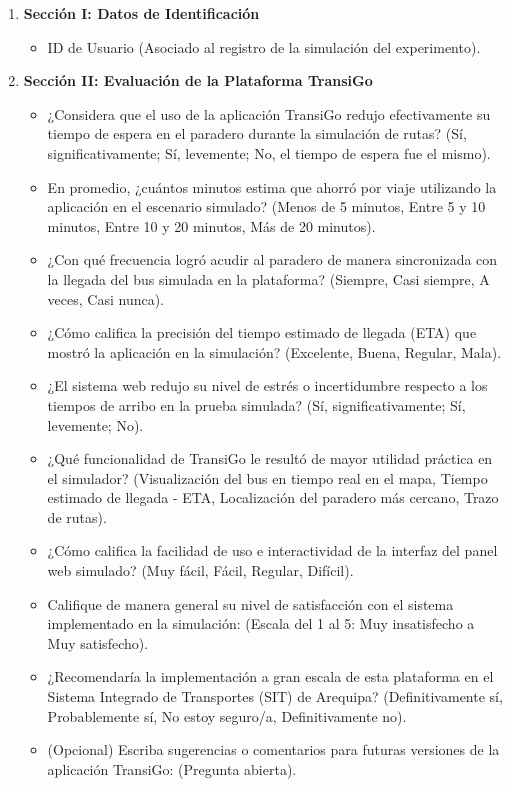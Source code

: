 \begin{enumerate}
    \item \textbf{Sección I: Datos de Identificación}
    \begin{itemize}
        \item ID de Usuario (Asociado al registro de la simulación del experimento).
    \end{itemize}
    
    \item \textbf{Sección II: Evaluación de la Plataforma TransiGo}
    \begin{itemize}
        \item ¿Considera que el uso de la aplicación TransiGo redujo efectivamente su tiempo de espera en el paradero durante la simulación de rutas? (Sí, significativamente; Sí, levemente; No, el tiempo de espera fue el mismo).
        \item En promedio, ¿cuántos minutos estima que ahorró por viaje utilizando la aplicación en el escenario simulado? (Menos de 5 minutos, Entre 5 y 10 minutos, Entre 10 y 20 minutos, Más de 20 minutos).
        \item ¿Con qué frecuencia logró acudir al paradero de manera sincronizada con la llegada del bus simulada en la plataforma? (Siempre, Casi siempre, A veces, Casi nunca).
        \item ¿Cómo califica la precisión del tiempo estimado de llegada (ETA) que mostró la aplicación en la simulación? (Excelente, Buena, Regular, Mala).
        \item ¿El sistema web redujo su nivel de estrés o incertidumbre respecto a los tiempos de arribo en la prueba simulada? (Sí, significativamente; Sí, levemente; No).
        \item ¿Qué funcionalidad de TransiGo le resultó de mayor utilidad práctica en el simulador? (Visualización del bus en tiempo real en el mapa, Tiempo estimado de llegada - ETA, Localización del paradero más cercano, Trazo de rutas).
        \item ¿Cómo califica la facilidad de uso e interactividad de la interfaz del panel web simulado? (Muy fácil, Fácil, Regular, Difícil).
        \item Califique de manera general su nivel de satisfacción con el sistema implementado en la simulación: (Escala del 1 al 5: Muy insatisfecho a Muy satisfecho).
        \item ¿Recomendaría la implementación a gran escala de esta plataforma en el Sistema Integrado de Transportes (SIT) de Arequipa? (Definitivamente sí, Probablemente sí, No estoy seguro/a, Definitivamente no).
        \item (Opcional) Escriba sugerencias o comentarios para futuras versiones de la aplicación TransiGo: (Pregunta abierta).
    \end{itemize}
\end{enumerate}

